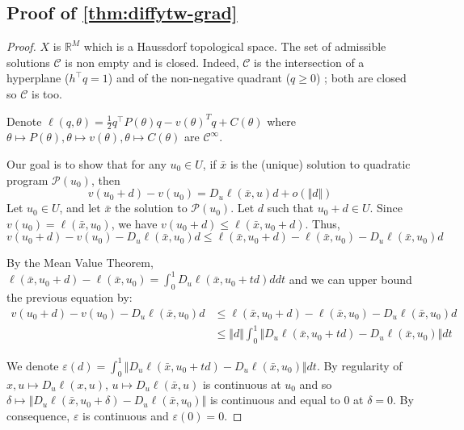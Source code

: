 \subsection{Proof of \cref{thm:diffytw-grad}}\label{sec:proof-diffytw-grad}
\begin{proof}
    $X$ is $\mathbb R^M$ which is a Haussdorf topological space. The set of admissible solutions $\mathcal C$ is non empty and is closed. Indeed, $\mathcal C$ is the intersection of a hyperplane ($h^\top q=1$) and of the non-negative quadrant ($q \geq 0$) ; both are closed so $\mathcal C$ is too.

    Denote $\ell(q, \theta) = \frac{1}{2}q^\top P(\theta) q - v(\theta)^Tq + C(\theta)$ where $\theta \mapsto P(\theta), \theta \mapsto v(\theta), \theta \mapsto C(\theta)$ are $\mathcal C^\infty$.

   Our goal is to show that for any $u_0\in U$, if $\bar x$ is the (unique) solution to quadratic program $\mathcal P(u_0)$, then
   \begin{equation}\label{eq:goal}
       v(u_0 + d) - v(u_0) = D_u \ell(\bar x, u)d + o\left(\Vert d\Vert\right)
   \end{equation}
   Let $u_0 \in U$, and let $\bar x$ the solution to $\mathcal P(u_0)$. Let $d$ such that $u_0 + d \in U$. Since $v(u_0) = \ell(\bar x, u_0)$, we have $v(u_0+d) \leq \ell(\bar x, u_0 + d)$. Thus,
   \begin{equation}
       v(u_0 + d) - v(u_0) - D_u\ell(\bar x, u_0)d \leq \ell(\bar x, u_0 + d) - \ell(\bar x, u_0) - D_u \ell(\bar x, u_0)d
   \end{equation}

    By the Mean Value Theorem, $\ell(\bar x, u_0 + d) - \ell(\bar x, u_0) = \int_0^1 D_u\ell(\bar x, u_0 + td)ddt$ and we can upper bound the previous equation by:
   \begin{align}
       v(u_0 + d) - v(u_0) - D_u\ell(\bar x, u_0)d&\leq \ell(\bar x, u_0 + d) - \ell(\bar x, u_0) - D_u \ell(\bar x, u_0)d\\
        &\leq \Vert d\Vert \int_0^1 \Vert D_u\ell(\bar x, u_0 +td) - D_u\ell(\bar x, u_0)\Vert dt
   \end{align}

   We denote $\varepsilon(d)= \int_0^1 \Vert D_u\ell(\bar x, u_0 +td) - D_u\ell(\bar x, u_0)\Vert dt$. By regularity of $x, u \mapsto D_u\ell(x, u)$, $u \mapsto D_u\ell(\bar x, u)$ is continuous at $u_0$ and so $ \delta \mapsto \Vert D_u\ell(\bar x, u_0 + \delta) -D_u\ell(\bar x, u_0)\Vert$ is continuous and equal to $0$ at $\delta=0$. By consequence, $\varepsilon$ is continuous and $\varepsilon(0)=0$.


\end{proof}
